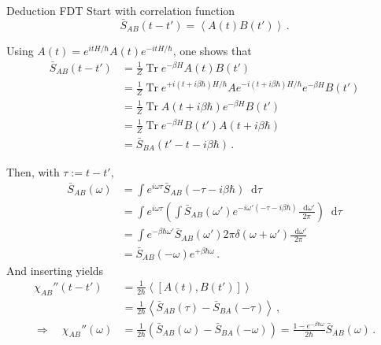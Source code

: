 \documentclass[xcolor=x11names,compress]{beamer}
\renewcommand{\(}{\begin{columns}}
\renewcommand{\)}{\end{columns}}
\newcommand{\<}[1]{\begin{column}{#1}}
\renewcommand{\>}{\end{column}}
\newcommand*\diff{\mathop{}\!\text{d}}
\DeclareMathOperator{\Tr}{Tr} %
\begin{document}
\begin{frame}[t]{Deduction FDT}
Start with correlation function
\begin{equation*}
    \bar{S}_{AB}(t-t') 
        = \left \langle A(t)B(t') \right \rangle \,.
\end{equation*}

Using $A(t) = e^{itH/\hbar}A(t)e^{-itH/\hbar}$, one shows that
\begin{align*}
    \bar{S}_{AB}(t - t') 
&= \frac{1}{Z}\Tr e^{-\beta H} A(t)B(t') \\
&= \frac{1}{Z}\Tr e^{+i(t + i\beta\hbar) H/\hbar} Ae^{-i(t + i\beta\hbar) H / \hbar}
    e^{-\beta H}B(t') \\
&= \frac{1}{Z}\Tr A(t + i\beta\hbar)e^{-\beta H}B(t') \\
&= \frac{1}{Z}\Tr e^{-\beta H}B(t')A(t + i\beta\hbar) \\
&= \bar{S}_{BA}(t' - t - i\beta\hbar) \,.
\end{align*}
\end{frame}

\begin{frame}[t]{}
Then, with $\tau := t - t'$, 
\begin{align*}
\bar{S}_{AB}(\omega) 
&= \int e^{i\omega\tau} \bar{S}_{AB}(-\tau - i\beta\hbar)\diff \tau \\
&= \int e^{i\omega\tau} \left( \int
\bar{S}_{AB}(\omega') e^{-i\omega'(-\tau - i\beta\hbar)}
\frac{\diff \omega'}{2\pi}
\right)\diff \tau \\
&= \int e^{-\beta\hbar\omega'} 
\bar{S}_{AB}(\omega') 2\pi \delta(\omega + \omega')
\frac{\diff \omega'}{2\pi} \\
&= \bar{S}_{AB}(-\omega) e^{+\beta \hbar \omega}\,.
\end{align*}
And inserting yields
\begin{align*}
\chi_{AB}''(t - t')
    &= \frac{1}{2\hbar} \left \langle [A(t), B(t')] \right \rangle \\
    &= \frac{1}{2\hbar} \left \langle \bar{S}_{AB}(\tau) - \bar{S}_{BA}(-\tau) \right \rangle\,, \\
\Rightarrow \quad 
\chi_{AB}''(\omega) 
    &= \frac{1}{2\hbar}\left( \bar{S}_{AB}(\omega) - \bar{S}_{BA}(-\omega) \right)
    = \frac{1 - e^{-\beta \hbar \omega}}{2 \hbar} \bar{S}_{AB}(\omega) \,.
\end{align*}
\end{frame}

\end{document}
